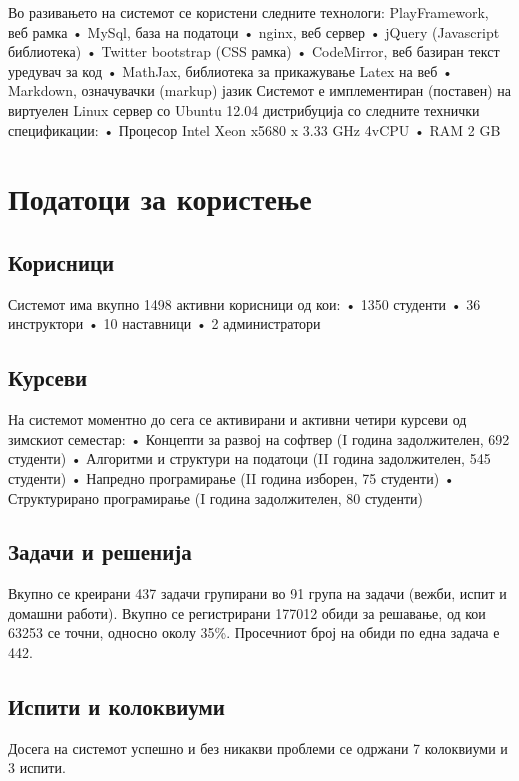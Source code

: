 \documentclass[a4paper,twocolumn]{article}
\begin{document}
Во разивањето на системот се користени следните технологи:
 PlayFramework, веб рамка
•   MySql, база на податоци
•   nginx, веб сервер
•   jQuery (Javascript библиотека)
•   Twitter bootstrap (CSS рамка)
•   CodeMirror, веб базиран текст уредувач за код
•   MathJax, библиотека за прикажување Latex на веб
•   Markdown, означувачки (markup) јазик
Системот е имплементиран (поставен) на виртуелен Linux сервер со Ubuntu 12.04 дистрибуција со следните технички спецификации:
•   Процесор Intel Xeon x5680 x 3.33 GHz 4vCPU
•   RAM 2 GB

\section{Податоци за користење}

\subsection{Корисници}

Системот има вкупно 1498 активни корисници од кои:
•   1350 студенти
•   36 инструктори
•   10 наставници
•   2 администратори

\subsection{Курсеви}

На системот моментно до сега се активирани и активни четири курсеви од зимскиот семестар:
•   Концепти за развој на софтвер (I година задолжителен, 692 студенти)
•   Алгоритми и структури на податоци (II година задолжителен, 545 студенти)
•   Напредно програмирање (II година изборен, 75 студенти)
•   Структурирано програмирање (I година задолжителен, 80 студенти)

\subsection{Задачи и решенија}

Вкупно се креирани 437 задачи групирани во 91 група на задачи (вежби, испит и домашни работи).
Вкупно се регистрирани 177012 обиди за решавање, од кои 63253 се точни, односно
околу 35\%. Просечниот број на обиди по една задача е 442.

\subsection{Испити и колоквиуми}

Досега на системот успешно и без никакви проблеми се одржани 7 колоквиуми и 3 испити.
\end{document}
